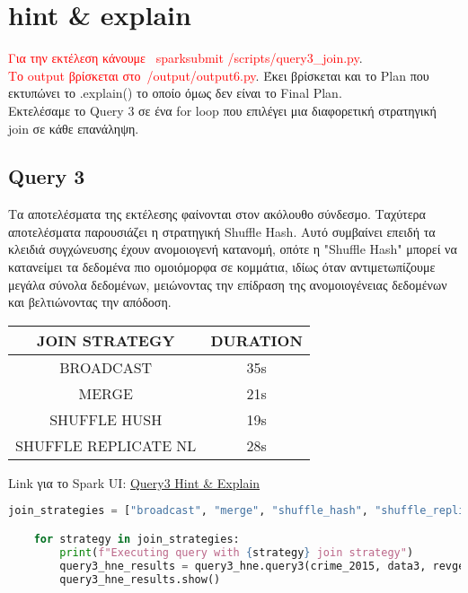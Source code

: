 \documentclass{article}
\begin{document}
\vspace{3\baselineskip}
\section{hint \& explain}

\textcolor{red}{Για την εκτέλεση κάνουμε  spark\-submit /scripts/query3_join.py}.  \\
\textcolor{red}{Το output βρίσκεται στο /output/output6.py}. Έκει βρίσκεται και το Plan που εκτυπώνει το .explain() το οποίο όμως δεν είναι το Final Plan. \\ 
Εκτελέσαμε το Query 3 σε ένα for loop που επιλέγει μια διαφορετική στρατηγική join σε 
κάθε επανάληψη.

\subsection*{Query 3}

Τα αποτελέσματα της εκτέλεσης φαίνονται στον ακόλουθο σύνδεσμο. Ταχύτερα αποτελέσματα 
παρουσιάζει η στρατηγική Shuffle Hash. Αυτό συμβαίνει επειδή τα κλειδιά συγχώνευσης έχουν 
ανομοιογενή κατανομή, οπότε η "Shuffle Hash" μπορεί να κατανείμει τα δεδομένα πιο ομοιόμορφα σε κομμάτια, ιδίως όταν αντιμετωπίζουμε μεγάλα σύνολα δεδομένων, μειώνοντας την επίδραση της ανομοιογένειας δεδομένων και βελτιώνοντας την απόδοση.\\

\begin{center}
\begin{tabular}{|c|c|}
\hline
\textbf{JOIN STRATEGY} & \textbf{DURATION} \\
\hline
BROADCAST & 35s \\
\hline
MERGE & 21s \\
\hline
SHUFFLE HUSH & 19s \\
\hline
SHUFFLE REPLICATE NL & 28s \\
\hline
\end{tabular}
\end{center} 

\vspace{3\baselineskip}

Link για το Spark UI:
\href{http://83.212.81.191:18080/history/application_1705357398960_0018/jobs/} {Query3 Hint \& Explain}
\begin{lstlisting}[language = Python]
    join_strategies = ["broadcast", "merge", "shuffle_hash", "shuffle_replicate_nl"]

    for strategy in join_strategies:
        print(f"Executing query with {strategy} join strategy")
        query3_hne_results = query3_hne.query3(crime_2015, data3, revgecoding, strategy)
        query3_hne_results.show()
\end{lstlisting}
\end{document}
